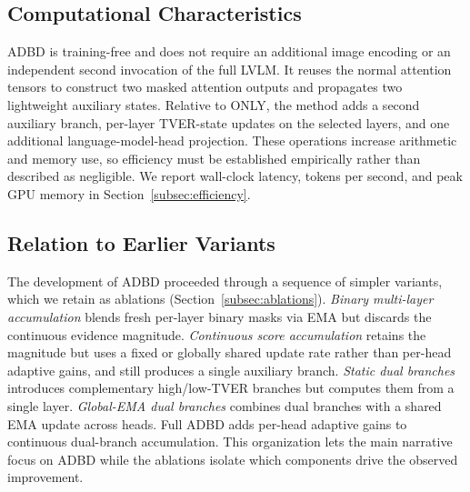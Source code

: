 \subsection{Computational Characteristics}

ADBD is training-free and does not require an additional image encoding or an independent second invocation of the full LVLM. It reuses the normal attention tensors to construct two masked attention outputs and propagates two lightweight auxiliary states. Relative to ONLY, the method adds a second auxiliary branch, per-layer TVER-state updates on the selected layers, and one additional language-model-head projection. These operations increase arithmetic and memory use, so efficiency must be established empirically rather than described as negligible. We report wall-clock latency, tokens per second, and peak GPU memory in Section~\ref{subsec:efficiency}.

\subsection{Relation to Earlier Variants}
\label{subsec:discussion}

The development of ADBD proceeded through a sequence of simpler variants, which we retain as ablations (Section~\ref{subsec:ablations}). \emph{Binary multi-layer accumulation} blends fresh per-layer binary masks via EMA but discards the continuous evidence magnitude. \emph{Continuous score accumulation} retains the magnitude but uses a fixed or globally shared update rate rather than per-head adaptive gains, and still produces a single auxiliary branch. \emph{Static dual branches} introduces complementary high/low-TVER branches but computes them from a single layer. \emph{Global-EMA dual branches} combines dual branches with a shared EMA update across heads. Full ADBD adds per-head adaptive gains to continuous dual-branch accumulation. This organization lets the main narrative focus on ADBD while the ablations isolate which components drive the observed improvement.